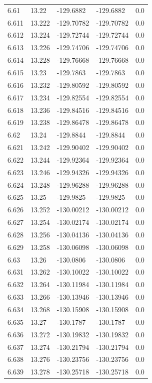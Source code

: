 \begin{tabular}{lllll}
6.61 & 13.22 & -129.6882 & -129.6882 & 0.0 \\
6.611 & 13.222 & -129.70782 & -129.70782 & 0.0 \\
6.612 & 13.224 & -129.72744 & -129.72744 & 0.0 \\
6.613 & 13.226 & -129.74706 & -129.74706 & 0.0 \\
6.614 & 13.228 & -129.76668 & -129.76668 & 0.0 \\
6.615 & 13.23 & -129.7863 & -129.7863 & 0.0 \\
6.616 & 13.232 & -129.80592 & -129.80592 & 0.0 \\
6.617 & 13.234 & -129.82554 & -129.82554 & 0.0 \\
6.618 & 13.236 & -129.84516 & -129.84516 & 0.0 \\
6.619 & 13.238 & -129.86478 & -129.86478 & 0.0 \\
6.62 & 13.24 & -129.8844 & -129.8844 & 0.0 \\
6.621 & 13.242 & -129.90402 & -129.90402 & 0.0 \\
6.622 & 13.244 & -129.92364 & -129.92364 & 0.0 \\
6.623 & 13.246 & -129.94326 & -129.94326 & 0.0 \\
6.624 & 13.248 & -129.96288 & -129.96288 & 0.0 \\
6.625 & 13.25 & -129.9825 & -129.9825 & 0.0 \\
6.626 & 13.252 & -130.00212 & -130.00212 & 0.0 \\
6.627 & 13.254 & -130.02174 & -130.02174 & 0.0 \\
6.628 & 13.256 & -130.04136 & -130.04136 & 0.0 \\
6.629 & 13.258 & -130.06098 & -130.06098 & 0.0 \\
6.63 & 13.26 & -130.0806 & -130.0806 & 0.0 \\
6.631 & 13.262 & -130.10022 & -130.10022 & 0.0 \\
6.632 & 13.264 & -130.11984 & -130.11984 & 0.0 \\
6.633 & 13.266 & -130.13946 & -130.13946 & 0.0 \\
6.634 & 13.268 & -130.15908 & -130.15908 & 0.0 \\
6.635 & 13.27 & -130.1787 & -130.1787 & 0.0 \\
6.636 & 13.272 & -130.19832 & -130.19832 & 0.0 \\
6.637 & 13.274 & -130.21794 & -130.21794 & 0.0 \\
6.638 & 13.276 & -130.23756 & -130.23756 & 0.0 \\
6.639 & 13.278 & -130.25718 & -130.25718 & 0.0 \\

\end{tabular}
